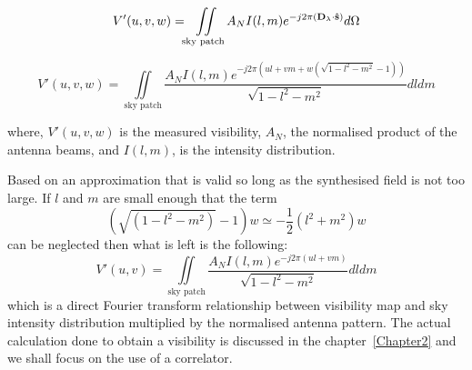 \begin{equation}
V'(u,v,w) =  \iint \limits_{\textrm{sky patch}}{A_{N}I(l,m)e^{-j2\pi{({\bf D}_{\lambda}\cdot{{\bf \hat{s}}})}}d\Omega} 
\end{equation}


\begin{equation}
V'(u,v,w) = \iint \limits_{\textrm{sky patch}}{\frac{A_{N}I(l,m)e^{-j2\pi{(ul +vm +w(\sqrt{1-l^2-m^2}-1))}}}{{\sqrt{1 - l^2 - m^2}}}}dldm 
\end{equation}

where, $V'(u,v,w)$ is the measured visibility, $A_{N}$, the normalised product of the antenna beams, and $I(l,m)$, is the intensity distribution.

Based on an approximation that is valid so long as the synthesised field is not too large. If $l$ and $m$ are small enough that the term 
\begin{equation}
\label{eq:Approx}
\left(\sqrt{(1-l^2 -m^2)} - 1 \right)w \simeq -\frac{1}{2}(l^2 + m^2)w
\end{equation}
can be neglected then what is left is the following:
\begin{equation}
\label{eq:visEq}
V'(u,v) = \iint \limits_{\textrm{sky patch}}{\frac{A_{N}I(l,m)e^{-j2\pi{(ul +vm)}}}{{\sqrt{1 - l^2 - m^2}}}}dldm 
\end{equation}
which is a direct Fourier transform relationship between visibility map and sky intensity distribution multiplied by the normalised antenna pattern. The actual calculation done to obtain a visibility is discussed in the chapter~\ref{Chapter2} and we shall focus on the use of a correlator.

